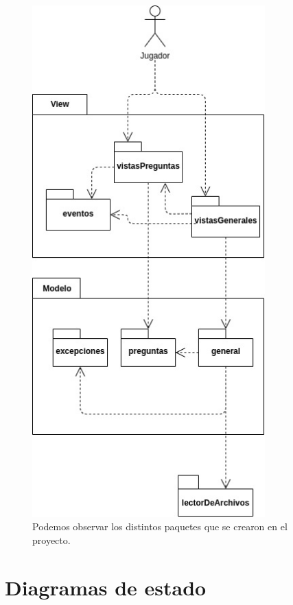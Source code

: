 \documentclass[titlepage,a4paper]{article}
\begin{document}
\begin{figure}[H]
\centering
\includegraphics[width=0.8\textwidth]{DiagramaDePaquetes.jpg}
\caption{\label{fig:seq02}Podemos observar los distintos paquetes que se crearon en el proyecto.}
\end{figure}

\section{Diagramas de estado}\label{sec:diagramasdeestados}
\end{document}

